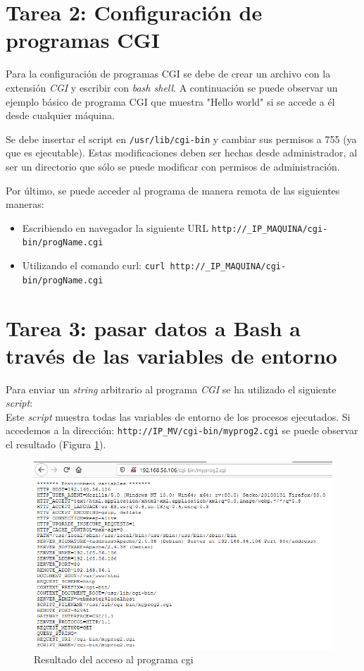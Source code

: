 \documentclass[10pt,a4paper]{article}
\begin{document}
\section{Tarea 2: Configuración de programas CGI}

Para la configuración de programas CGI se debe de crear un archivo con la extensión \emph{CGI} y escribir con \emph{bash shell}.
A continuación se puede observar un ejemplo básico de programa CGI que muestra "Hello world" si se accede a él desde cualquier máquina.
 

Se debe insertar el script en \texttt{/usr/lib/cgi-bin} y cambiar sus permisos a 755 (ya que es ejecutable). Estas modificaciones deben ser hechas desde administrador, al ser un directorio que sólo se puede modificar con permisos de administración. 

Por último, se puede acceder al programa de manera remota de las siguientes maneras: 
\begin{itemize}
	\item Escribiendo en navegador la siguiente URL \texttt{http://_IP_MAQUINA/cgi-bin/progName.cgi}
	\item Utilizando el comando curl: \texttt{curl http://_IP_MAQUINA/cgi-bin/progName.cgi}
\end{itemize}

\section{Tarea 3: pasar datos a Bash a través de las variables de entorno}

Para enviar un \emph{string} arbitrario al programa \emph{CGI} se ha utilizado el siguiente \emph{script}:\\



Este \emph{script} muestra todas las variables de entorno de los procesos ejecutados. Si accedemos a la dirección: \texttt{http://IP\_{}MV/cgi-bin/myprog2.cgi} se puede observar el resultado (Figura \ref{fig:tarea3_normal}).

\begin{figure}[h!]
\centering
\includegraphics[scale=0.6]{images/Tarea_3.png}
\caption{Resultado del acceso al programa cgi}
\label{fig:tarea3_normal} 
\end{figure}
\end{document}

